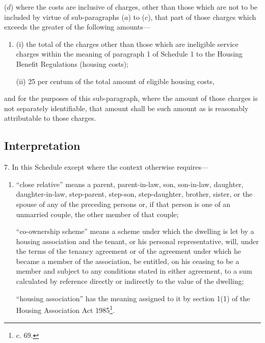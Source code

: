 \documentclass[12pt,a4paper]{article}
\begin{document}
\begin{enumerate}
($d$) where the costs are inclusive of charges, other than those which are not to be included by virtue of sub-paragraphs ($a$) to ($c$), that part of those charges which exceeds the greater of the following amounts—
\begin{enumerate}\item[]
(i) the total of the charges other than those which are ineligible service charges within the meaning of paragraph 1 of Schedule 1 to the Housing Benefit Regulations (housing costs);

(ii) 25 per centum of the total amount of eligible housing costs,
\end{enumerate}
and for the purposes of this sub-paragraph, where the amount of those charges is not separately identifiable, that amount shall be such amount as is reasonably attributable to those charges.
\end{enumerate}


\subsection*{Interpretation}

7.  In this Schedule except where the context otherwise requires—
\begin{enumerate}\item[]
“close relative” means a parent, parent-in-law, son, son-in-law, daughter, daughter-in-law, step-parent, step-son, step-daughter, brother, sister, or the spouse of any of the preceding persons or, if that person is one of an unmarried couple, the other member of that couple;

“co-ownership scheme” means a scheme under which the dwelling is let by a housing association and the tenant, or his personal representative, will, under the terms of the tenancy agreement or of the agreement under which he became a member of the association, be entitled, on his ceasing to be a member and subject to any conditions stated in either agreement, to a sum calculated by reference directly or indirectly to the value of the dwelling;

“housing association” has the meaning assigned to it by section 1(1) of the Housing Association Act 1985\footnote{ c. 69.}.
\end{enumerate}
\end{document}
